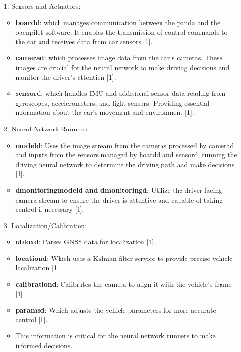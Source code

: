 \documentclass[12pt]{article}
\begin{document}
\begin{itemize}
    \item[1.] Sensors and Actuators:
        \begin{itemize}
            \item \textbf{boardd}: which manages communication between the panda and the openpilot software. It enables the transmission of control commands to the car and receives data from car sensors [1].
            \item \textbf{camerad}: which processes image data from the car’s cameras. These images are crucial for the neural network to make driving decisions and monitor the driver's attention [1].
            \item \textbf{sensord}: which handles IMU and additional sensor data reading from gyroscopes, accelerometers, and light sensors. Providing essential information about the car's movement and environment [1]. 
        \end{itemize}
    \item[2. ] Neural Network Runners:
         \begin{itemize}
            \item \textbf{modeld}: Uses the image stream from the cameras processed by camerad and inputs from the sensors managed by boardd and sensord, running the driving neural network to determine the driving path and make decisions [1].
            \item \textbf{dmonitoringmodeld and dmonitoringd}: Utilize the driver-facing camera stream to ensure the driver is attentive and capable of taking control if necessary [1].
        \end{itemize}
    \item[3. ] Localization/Calibration:
        \begin{itemize}
            \item \textbf{ubloxd}: Parses GNSS data for localization [1].
            \item \textbf{locationd}: Which uses a Kalman filter service to provide precise vehicle localization [1].
            \item \textbf{calibrationd}: Calibrates the camera to align it with the vehicle’s frame [1].
            \item \textbf{paramsd}: Which adjusts the vehicle parameters for more accurate control [1].
            \item This information is critical for the neural network runners to make informed decisions.
        \end{itemize}

\end{itemize}
\end{document}
